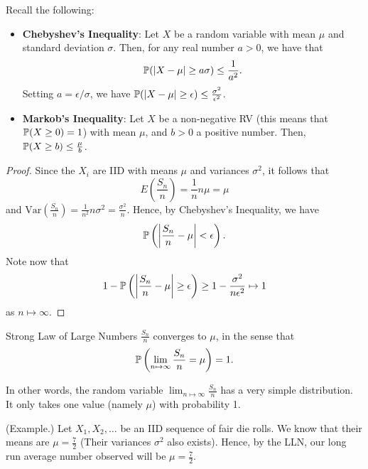 \documentclass[letterpaper]{article}
\begin{document}
Recall the following: 
\begin{itemize}
    \item \textbf{Chebyshev's Inequality}: Let $X$ be a random variable with mean $\mu$ and standard deviation $\sigma$. Then, for any real number $a > 0$, we have that 
    \[\mathbb{P}(|X - \mu| \geq a\sigma) \leq \frac{1}{a^2}.\]
    Setting $a = \epsilon / \sigma$, we have $\mathbb{P}(|X - \mu| \geq \epsilon) \leq \frac{\sigma^2}{\epsilon^2}$. 

    \item \textbf{Markob's Inequality}: Let $X$ be a non-negative RV (this means that $\mathbb{P}(X \geq 0) = 1$) with mean $\mu$, and $b > 0$ a positive number. Then, $\mathbb{P}(X \geq b) \leq \frac{\mu}{b}$. 
\end{itemize}
\begin{mdframed}[]
    \begin{proof}
        Since the $X_i$ are IID with means $\mu$ and variances $\sigma^2$, it follows that 
        \[E\left(\frac{S_n}{n}\right) = \frac{1}{n}n\mu = \mu\]
        and $\text{Var}\left(\frac{S_n}{n}\right) = \frac{1}{n^2} n\sigma^2 = \frac{\sigma^2}{n}$. Hence, by Chebyshev's Inequality, we have 
        \[\mathbb{P}\left(\left|\frac{S_n}{n} - \mu \right| < \epsilon\right).\]
        Note now that 
        \[1 - \mathbb{P}\left(\left|\frac{S_n}{n} - \mu\right| \geq \epsilon\right) \geq 1 - \frac{\sigma^2}{n\epsilon^2} \mapsto 1\]
        as $n \mapsto \infty$. 
    \end{proof}
\end{mdframed}

\begin{theorem}{Strong Law of Large Numbers}{}
    $\frac{S_n}{n}$ converges to $\mu$, in the sense that \[\mathbb{P}\left(\lim_{n \mapsto \infty} \frac{S_n}{n} = \mu\right) = 1.\]
\end{theorem}
In other words, the random variable $\lim_{n \mapsto \infty} \frac{S_n}{n}$ has a very simple distribution. It only takes one value (namely $\mu$) with probability 1.


\begin{mdframed}[]
    (Example.) Let $X_1, X_2, \dots$ be an IID sequence of fair die rolls. We know that their means are $\mu = \frac{7}{2}$ (Their variances $\sigma^2$ also exists). Hence, by the LLN, our long run average number observed will be $\mu = \frac{7}{2}$. 
\end{mdframed}
\end{document}
